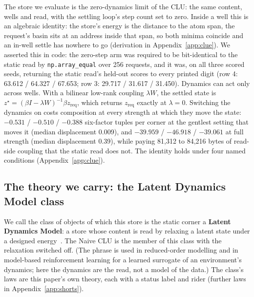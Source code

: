 \documentclass{article} %
\begin{document}
The store we evaluate is the zero-dynamics limit of the CLU: the same content, wells and read,
with the settling loop's step count set to zero. Inside a well this is an algebraic identity: the store's energy is the distance to the atom span, the request's basin sits at an address inside that span, so both minima coincide and an in-well settle has nowhere
to go (derivation in Appendix~\ref{app:clue}). We asserted this in code: the zero-step arm was required to be bit-identical to
the static read by \texttt{np.array\_equal} over 256 requests, and it was, on all three scored
seeds, returning the static read's held-out scores to every printed digit (row 4: 63.612 /
64.327 / 67.653; row 3: 29.717 / 31.617 / 31.450). %
Dynamics can act only across wells. With a bilinear low-rank coupling $\lambda W$, the settled
state is $z^\star=(\beta I-\lambda W)^{-1}\beta z_{\text{req}}$, which returns
$z_{\text{req}}$ exactly at $\lambda=0$. Switching the dynamics on costs composition at every
strength at which they move the state: $-0.531$ / $-0.510$ / $-0.388$ six-factor tuples per
corner at the gentlest setting that moves it (median displacement 0.009), and $-39.959$ /
$-46.918$ / $-39.061$ at full strength (median displacement 0.39), while paying 81,312 to 84,216 bytes of read-side coupling that the static read does not. %
The identity holds under four named conditions (Appendix~\ref{app:clue}).

\subsection{The theory we carry: the Latent Dynamics Model class}
\label{sec:theory}

We call the class of objects of which this store is the static corner a \textbf{Latent Dynamics
Model}: a store whose content is read by relaxing a latent state under a designed energy~\citep{hopfield1982neural,krotov2016dense,ramsauer2021hopfield,hoover2023energy,kong2024reservoir}. The
Naive CLU is the member of this class with the relaxation switched off. (The phrase is used in
reduced-order modelling and in model-based reinforcement learning for a learned surrogate of an
environment's dynamics; here the dynamics are the read, not a model of the data.) The class's laws are this paper's own theory, each with a status label and rider (further laws in
Appendix~\ref{app:shorts}).
\end{document}
